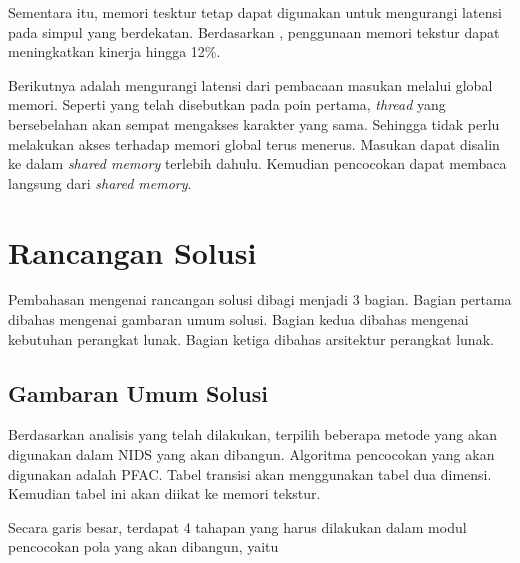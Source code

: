       Sementara itu, memori tesktur tetap dapat digunakan untuk mengurangi latensi pada simpul yang berdekatan. Berdasarkan \citep{lin2013}, penggunaan memori tekstur dapat meningkatkan kinerja hingga 12\%.

      Berikutnya adalah mengurangi latensi dari pembacaan masukan melalui global memori. Seperti yang telah disebutkan pada poin pertama, \emph{thread} yang bersebelahan akan sempat mengakses karakter yang sama. Sehingga tidak perlu melakukan akses terhadap memori global terus menerus. Masukan dapat disalin ke dalam \emph{shared memory} terlebih dahulu. Kemudian pencocokan dapat membaca langsung dari \emph{shared memory}.

  \section{Rancangan Solusi}

    Pembahasan mengenai rancangan solusi dibagi menjadi 3 bagian. Bagian pertama dibahas mengenai gambaran umum solusi. Bagian kedua dibahas mengenai kebutuhan perangkat lunak. Bagian ketiga dibahas arsitektur perangkat lunak. 

    \subsection{Gambaran Umum Solusi}

      Berdasarkan  analisis  yang  telah  dilakukan, terpilih beberapa metode yang akan digunakan dalam NIDS yang akan dibangun. Algoritma pencocokan yang akan digunakan adalah PFAC. Tabel transisi akan menggunakan tabel dua dimensi. Kemudian tabel ini akan diikat ke memori tekstur.

      Secara garis besar, terdapat 4 tahapan yang harus dilakukan dalam modul pencocokan pola yang akan dibangun, yaitu

